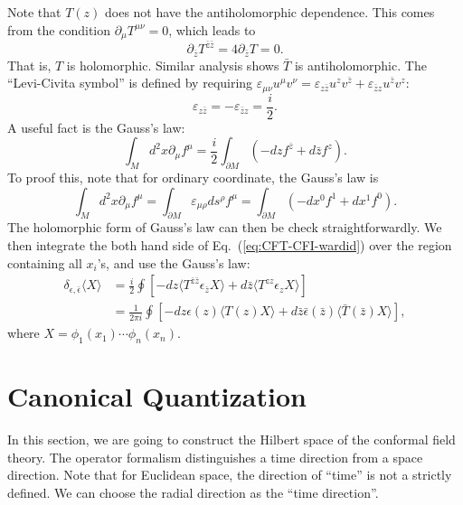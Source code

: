 \documentclass[aps,prb,superscriptaddress,nofootinbib]{revtex4}
\begin{document}
Note that $T(z)$ does not have the antiholomorphic dependence.
This comes from the condition $\partial_\mu T^{\mu\nu} = 0$, which leads to
\begin{equation}
	\partial_{\bar z} T^{\bar z \bar z} = 4 \partial_{\bar z} T = 0.
\end{equation}
That is, $T$ is holomorphic.
Similar analysis shows $\bar T$ is antiholomorphic.
The ``Levi-Civita symbol'' is defined by requiring $\varepsilon_{\mu\nu} u^\mu v^\nu = \varepsilon_{z\bar z} u^z v^{\bar z} + \varepsilon_{\bar z z} u^{\bar z} v^{z}$:
\begin{equation}
	\varepsilon_{z\bar z} = -\varepsilon_{\bar z z} = \frac{i}{2}.
\end{equation}
A useful fact is the Gauss's law:
\begin{equation}
	\int_M d^2 x \partial_\mu f^\mu = \frac{i}{2} \int_{\partial M}\left(- dz f^{\bar z} + d\bar z f^{z}\right).
\end{equation}
To proof this, note that for ordinary coordinate, the Gauss's law is
\begin{equation}
	\int_M d^2 x \partial_\mu f^\mu = \int_{\partial M} \varepsilon_{\mu\rho} d s^\rho f^\mu
	= \int_{\partial M} \left(- dx^0 f^1 + dx^1 f^0 \right).
\end{equation}
The holomorphic form of Gauss's law can then be check straightforwardly.
We then integrate the both hand side of Eq.~(\ref{eq:CFT-CFI-wardid}) over the region containing all $x_i$'s, and use the Gauss's law:
\begin{equation}
\begin{aligned}
	\delta_{\epsilon,\bar\epsilon} \langle X \rangle 
	&= \frac{i}{2}\oint \left[-dz \langle T^{\bar z \bar z} \epsilon_{\bar z} X \rangle + d\bar z \langle T^{z z}\epsilon_{z} X\rangle \right] \\
	&= \frac{1}{2\pi i}\oint \left[-dz \epsilon(z)\langle T(z) X \rangle + d\bar z \bar\epsilon(\bar z) \langle \bar T(\bar z) X\rangle \right],
\end{aligned}
\end{equation}
where $X = \phi_1(x_1) \cdots \phi_n(x_n)$.





\section{Canonical Quantization}

In this section, we are going to construct the Hilbert space of the conformal field theory.
The operator formalism distinguishes a time direction from a space direction.
Note that for Euclidean space, the direction of ``time'' is not a strictly defined.
We can choose the radial direction as the ``time direction''.
\end{document}
